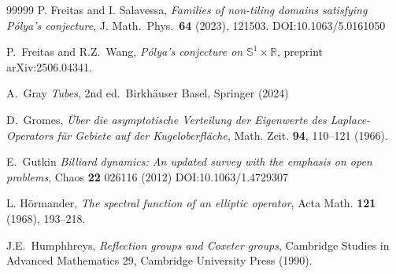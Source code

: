 \documentclass[11pt,a4paper,times]{amsart}
\theoremstyle{plain}
\theoremstyle{definition}
\numberwithin{equation}{section}
\newcommand{\R}{\mathbb{R}}
\newcommand{\Se}{\mathbb{S}}
\begin{document}
{\begin{thebibliography}{99999}
P. Freitas and I. Salavessa,
\emph{Families of non-tiling domains satisfying P\'{o}lya's conjecture},
{J. Math.\ Phys.}\ {\bf 64} (2023), 121503.
 DOI:10.1063/5.0161050

P.\ Freitas and R.Z.~Wang,
\emph{P\'{o}lya's conjecture on $\mathbb{S}^1 \times \R$}, preprint arXiv:2506.04341.

 A.\ Gray
\emph{Tubes}, 2nd ed.\  Birkh\"{a}user Basel, Springer (2024)


D.\ Gromes, 
\emph{\"{U}ber die asymptotische Verteilung der Eigenwerte des Laplace-Operators
f\"{u}r Gebiete auf der Kugeloberfl\"{a}che},
{Math. Zeit.} {\bf 94}, 110--121 (1966).



 E.\ Gutkin
 \emph{Billiard dynamics: An updated survey with the emphasis on open problems},
 Chaos {\bf 22} 026116 (2012)
 DOI:10.1063/1.4729307






L. H\"{o}rmander,
{\it The spectral function of an elliptic operator},
Acta Math. {\bf 121} (1968), 193--218.

J.E.\ Humphhreys, \emph{Reflection groups and Coxeter groups}, Cambridge Studies in Advanced Mathematics 29,
Cambridge University Press (1990).


\end{thebibliography}}
\end{document}
